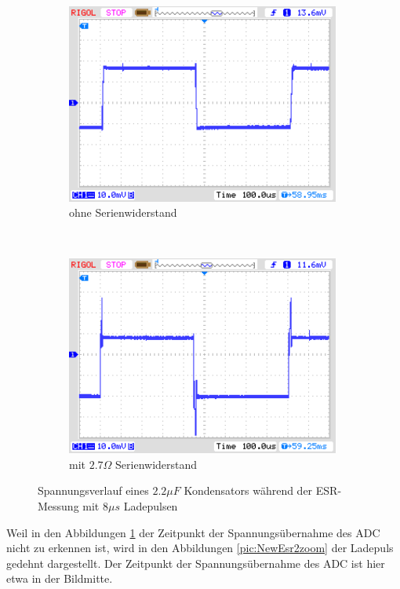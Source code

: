 \begin{figure}[H]
  \begin{subfigure}[b]{9cm}
    \centering
    \includegraphics[width=9cm]{../PNG/NewEsr2u2F0R0.png}
    \caption{ohne Serienwiderstand}
  \end{subfigure}
  ~
  \begin{subfigure}[b]{9cm}
    \centering
    \includegraphics[width=9cm]{../PNG/NewEsr2u2F2R7.png}
    \caption{mit \(2.7\Omega\) Serienwiderstand}
  \end{subfigure}
  \caption{Spannungsverlauf eines \(2.2\mu F\) Kondensators während der ESR-Messung mit \(8 \mu s\) Ladepulsen}
  \label{pic:NewEsr2}
\end{figure}

Weil in den Abbildungen \ref{pic:NewEsr2} der Zeitpunkt der Spannungsübernahme des ADC nicht zu erkennen ist,
wird in den Abbildungen \ref{pic:NewEsr2zoom} der Ladepuls gedehnt dargestellt. Der Zeitpunkt der Spannungsübernahme
des ADC ist hier etwa in der Bildmitte.

